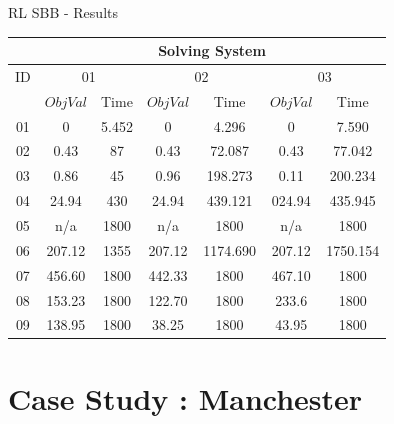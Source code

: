 \documentclass[aspectratio=169]{beamer}
\begin{document}
\begin{frame}{RL SBB - Results}
    \begin{table}[ht]
        \centering
        \begin{tabular}{|c|cc|cc|cc|}
            \hline
             & \multicolumn{6}{|c|}{\textbf{Solving System}} \\
            \hline
            ID & \multicolumn{2}{|c|}{01} & \multicolumn{2}{|c|}{02} & \multicolumn{2}{|c|}{03}\\
            \hline
             & $ObjVal$ & Time & $ObjVal$ & Time & $ObjVal$ & Time \\
            \hline
            01 & 0 & 5.452 & 0 & 4.296 & 0 & 7.590 \\
            02 & 0.43 & 87 & 0.43 & 72.087 & 0.43 & 77.042 \\ 
            03 & 0.86 & 45 & 0.96 & 198.273 & 0.11 & 200.234 \\ 
            04 & 24.94 & 430 & 24.94 & 439.121 & 024.94 & 435.945 \\ 
            05 & n/a & 1800 & n/a & 1800 & n/a & 1800 \\
            06 & 207.12 & 1355 & 207.12 & 1174.690 & 207.12 & 1750.154 \\ 
            07 & 456.60 & 1800 & 442.33 & 1800 & 467.10 & 1800 \\
            08 & 153.23 & 1800 & 122.70 & 1800 & 233.6 & 1800 \\
            09 & 138.95 & 1800 & 38.25 & 1800 & 43.95 & 1800 \\
            \hline
        \end{tabular}
    \end{table}
\end{frame}


\section{Case Study : Manchester}
\end{document}
